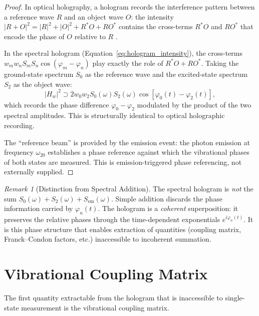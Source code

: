 \documentclass[11pt,a4paper]{article}
\theoremstyle{definition}
\theoremstyle{remark}
\newtheorem{remark}[theorem]{Remark}
\begin{document}
\begin{proof}
In optical holography, a hologram records the interference pattern between a reference wave $R$ and an object wave $O$: the intensity $|R + O|^2 = |R|^2 + |O|^2 + R^*O + RO^*$ contains the cross-terms $R^*O$ and $RO^*$ that encode the phase of $O$ relative to $R$ \citep{bornwolf1999}.

In the spectral hologram (Equation~\ref{eq:hologram_intensity}), the cross-terms $w_m w_n S_m S_n \cos(\varphi_m - \varphi_n)$ play exactly the role of $R^*O + RO^*$. Taking the ground-state spectrum $S_0$ as the reference wave and the excited-state spectrum $S_2$ as the object wave:
\begin{equation}
|H_w|^2 \supset 2w_0 w_2 S_0(\omega) S_2(\omega) \cos[\varphi_0(t) - \varphi_2(t)],
\end{equation}
which records the phase difference $\varphi_0 - \varphi_2$ modulated by the product of the two spectral amplitudes. This is structurally identical to optical holographic recording.

The ``reference beam'' is provided by the emission event: the photon emission at frequency $\omega_{20}$ establishes a phase reference against which the vibrational phases of both states are measured. This is emission-triggered phase referencing, not externally supplied.
\end{proof}

\begin{remark}[Distinction from Spectral Addition]
\label{rem:not_addition}
The spectral hologram is \emph{not} the sum $S_0(\omega) + S_2(\omega) + S_{\mathrm{em}}(\omega)$. Simple addition discards the phase information carried by $\varphi_n(t)$. The hologram is a \emph{coherent} superposition: it preserves the relative phases through the time-dependent exponentials $e^{i\varphi_n(t)}$. It is this phase structure that enables extraction of quantities (coupling matrix, Franck--Condon factors, etc.) inaccessible to incoherent summation.
\end{remark}

\section{Vibrational Coupling Matrix}
\label{sec:coupling}

The first quantity extractable from the hologram that is inaccessible to single-state measurement is the vibrational coupling matrix.
\end{document}
